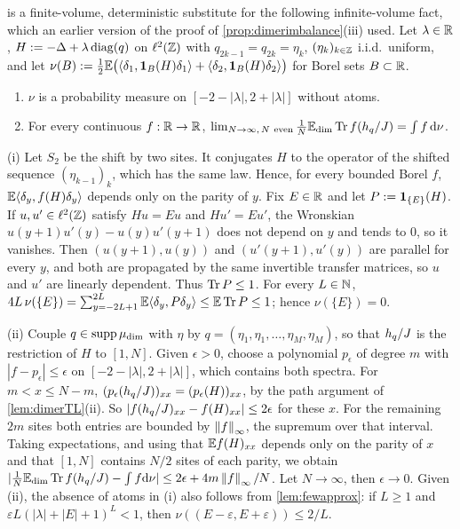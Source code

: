 \begin{remark}\label{rem:dimerdos}
 is a finite-volume, deterministic substitute for the following infinite-volume fact, which
an earlier version of the proof of \cref{prop:dimerimbalance}(iii) used.  Let $\lambda\in\mathbb{R}$,
$H:=-\Delta+\lambda\operatorname{diag}(q)$ on $\ell^2(\mathbb{Z})$ with $q_{2k-1}=q_{2k}=\eta_k$, $(\eta_k)_{k\in\mathbb{Z}}$ i.i.d.\ uniform, and let
$\nu(B):=\frac12\mathbb{E}\bigl(\langle\delta_1,\mathbf{1}_B(H)\delta_1\rangle+\langle\delta_2,\mathbf{1}_B(H)\delta_2\rangle\bigr)$ for
Borel sets $B\subset\mathbb{R}$.
\begin{enumerate}[label=(\roman*)]
\item $\nu$ is a probability measure on $[-2-|\lambda|,2+|\lambda|]$ without atoms.
\item For every continuous $f:\mathbb{R}\to\mathbb{R}$, $\lim_{N\to\infty,\,N\ \mathrm{even}}\frac1N\mathbb{E}_{\mathrm{dim}}\operatorname{Tr} f(h_{q}/J)=\int f\,\mathrm{d}\nu$.
\end{enumerate}
(i) Let $S_2$ be the shift by two sites.  It conjugates $H$ to the operator of the shifted sequence
$(\eta_{k-1})_k$, which has the same law.  Hence, for every bounded Borel $f$,
$\mathbb{E}\langle\delta_y,f(H)\delta_y\rangle$ depends only on the parity of $y$.  Fix $E\in\mathbb{R}$ and let
$P:=\mathbf{1}_{\{E\}}(H)$.  If $u,u'\in\ell^2(\mathbb{Z})$ satisfy $Hu=Eu$ and $Hu'=Eu'$, the Wronskian
$u(y+1)u'(y)-u(y)u'(y+1)$ does not depend on $y$ and tends to $0$, so it vanishes.  Then
$(u(y+1),u(y))$ and $(u'(y+1),u'(y))$ are parallel for every $y$, and both are propagated by the same
invertible transfer matrices, so $u$ and $u'$ are linearly dependent.  Thus $\operatorname{Tr} P\le1$.  For every
$L\in\mathbb{N}$, $4L\,\nu(\{E\})=\sum_{y=-2L+1}^{2L}\mathbb{E}\langle\delta_y,P\delta_y\rangle\le\mathbb{E}\operatorname{Tr} P\le1$; hence
$\nu(\{E\})=0$.

(ii) Couple $q\in\operatorname{supp}\mu_{\mathrm{dim}}$ with $\eta$ by $q=(\eta_1,\eta_1,\dots,\eta_M,\eta_M)$, so that $h_{q}/J$ is
the restriction of $H$ to $[1,N]$.  Given $\epsilon>0$, choose a polynomial $p_\epsilon$ of degree $m$ with
$|f-p_\epsilon|\le\epsilon$ on $[-2-|\lambda|,2+|\lambda|]$, which contains both spectra.  For $m<x\le N-m$,
$(p_\epsilon(h_{q}/J))_{xx}=(p_\epsilon(H))_{xx}$, by the path argument of \cref{lem:dimerTL}(ii).  So
$|f(h_{q}/J)_{xx}-f(H)_{xx}|\le2\epsilon$ for these $x$.  For the remaining $2m$ sites both entries are
bounded by $\left\|f\right\|_\infty$, the supremum over that interval.  Taking expectations, and using that
$\mathbb{E} f(H)_{xx}$ depends only on the parity of $x$ and that $[1,N]$ contains $N/2$ sites of each parity,
we obtain $|\frac1N\mathbb{E}_{\mathrm{dim}}\operatorname{Tr} f(h_{q}/J)-\int f\mathrm{d}\nu|\le2\epsilon+4m\left\|f\right\|_\infty/N$.  Let $N\to\infty$,
then $\epsilon\to0$.  Given (ii), the absence of atoms in (i) also follows from \cref{lem:fewapprox}: if $L\ge1$ and
$\varepsilon L(|\lambda|+|E|+1)^L<1$, then $\nu((E-\varepsilon,E+\varepsilon))\le2/L$.
\end{remark}

